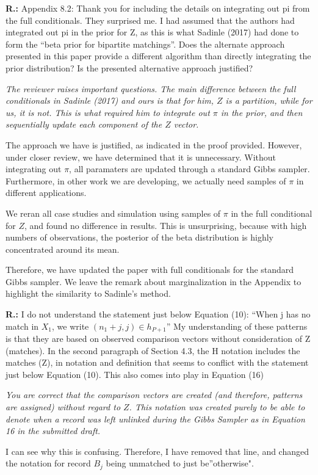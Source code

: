 \documentclass[letterpaper, parskip]{scrartcl}
\newcommand{\pointRaised}[2]{%
	\textbf{#1.\theresponsectr:} #2
}
\newcounter{responsectr}[section]     %
\newcommand{\reply}[1]{%
	\refstepcounter{responsectr}%
		\begin{tcolorbox}
			\itshape #1
		\end{tcolorbox}
}
\begin{document}
	\pointRaised{R}{%
Appendix 8.2: Thank you for including the details on integrating out pi from the full conditionals. They surprised me. I had assumed that the authors had integrated out pi in the prior for Z, as this is what Sadinle (2017) had done to form the “beta prior for bipartite matchings”. Does the alternate approach presented in this paper provide a different algorithm than directly integrating the prior distribution? Is the presented alternative approach justified?}

\reply{%
	The reviewer raises important questions. The main difference between the full conditionals in Sadinle (2017) and ours is that for him, $Z$ is a partition, while for us, it is not. This is what required him to integrate out $\pi$ in the prior, and then sequentially update each component of the $Z$ vector. 
	
	The approach we have is justified, as indicated in the proof provided. However, under closer review, we have determined that it is unnecessary. Without integrating out $\pi$, all paramaters are updated through a standard Gibbs sampler. Furthermore, in other work we are developing, we actually need samples of $\pi$ in different applications. 
	
	We reran all case studies and simulation using samples of $\pi$ in the full conditional for $Z$, and found no difference in results. This is unsurprising, because with high numbers of observations, the posterior of the beta distribution is highly concentrated around its mean.
	
	Therefore, we have updated the paper with full conditionals for the standard Gibbs sampler. We leave the remark about marginalization in the Appendix to highlight the similarity to Sadinle's method.

}

\pointRaised{R}{%
	I do not understand the statement just below Equation (10): “When j has no match in $X_1$, we write $(n_1 +j, j) \in h_{P+1}$” My understanding of these patterns is that they are based on observed comparison vectors without consideration of Z (matches). In the second paragraph of Section 4.3, the H notation includes the matches (Z), in notation and definition that seems to conflict with the statement just below Equation (10). This also comes into play in Equation (16)}

	\reply{%
	You are correct that the comparison vectors are created (and therefore, patterns are assigned) without regard to $Z$. This notation was created purely to be able to denote when a record was left unlinked during the Gibbs Sampler as in Equation 16 in the submitted draft. 
	
	I can see why this is confusing. Therefore, I have removed that line, and changed the notation for record $B_j$ being unmatched to just be''otherwise".
	}
\end{document}

